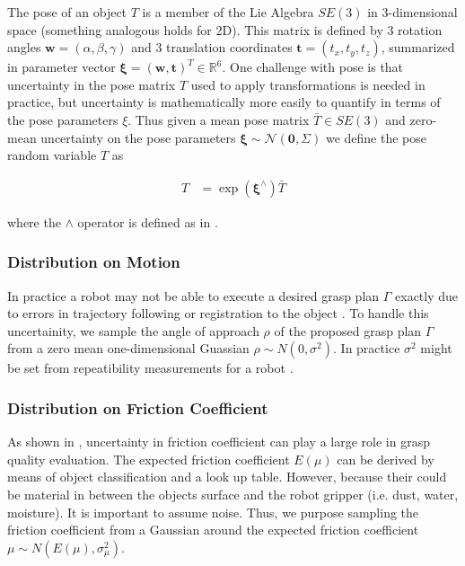 \documentclass[journal,transmag]{IEEEtran}%
\newcommand{\bw}{\mathbf{w}}
\newcommand{\bt}{\mathbf{t}}
\newcommand{\mN}{\mathcal{N}}
\begin{document}
The pose of an object $T$ is a member of the Lie Algebra $SE(3)$ in 3-dimensional space (something analogous holds for 2D).
This matrix is defined by 3 rotation angles $\bw = (\alpha, \beta, \gamma)$ and 3 translation coordinates $\bt = (t_x, t_y, t_z)$, summarized in parameter vector $\mathbf{\xi} = (\bw, \bt)^T \in \mathbb{R}^6$.
One challenge with pose is that uncertainty in the pose matrix $T$ used to apply transformations is needed in practice, but uncertainty is mathematically more easily to quantify in terms of the pose parameters $\xi$.
Thus given a mean pose matrix $\bar{T} \in SE(3)$ and zero-mean uncertainty on the pose parameters $\mathbf{\xi} \sim \mN \left( \mathbf{0}, \Sigma \right)$ we define the pose random variable $T$ as

\vspace{-2ex}
\begin{align*}
	T  &= \exp \left( \mathbf{\xi}^{\wedge} \right) \bar{T}
\end{align*}

\noindent where the $\wedge$ operator is defined as in \cite{barfoot2014Pose}.

 
 \subsubsection{Distribution on Motion}
 In practice a robot may not be able to execute a desired
grasp plan $\Gamma$ exactly due to errors in trajectory following or
registration to the object \cite{kehoe2012estimating}. To handle this uncertainity, we sample the angle of approach $\rho$ of the proposed grasp plan $\Gamma$ from a zero mean one-dimensional Guassian $\rho \sim N(0,\sigma^2)$. In practice $\sigma^2$ might be set from repeatibility measurements for a robot \cite{mooring1986determination}.

 
 \subsubsection{Distribution on Friction Coefficient}
As shown in \cite{zheng2005}, uncertainty in friction coefficient can play a large role in grasp quality evaluation. The expected friction coefficient $E(\mu)$ can be derived by means of object classification and a look up table. However, because their could be material in between the objects surface and the robot gripper (i.e. dust, water, moisture). It is important to assume noise.  Thus, we purpose sampling the friction coefficient from a Gaussian around the expected friction coefficient $\mu \sim N(E(\mu),\sigma_{\mu}^2)$. 
 
\end{document}
